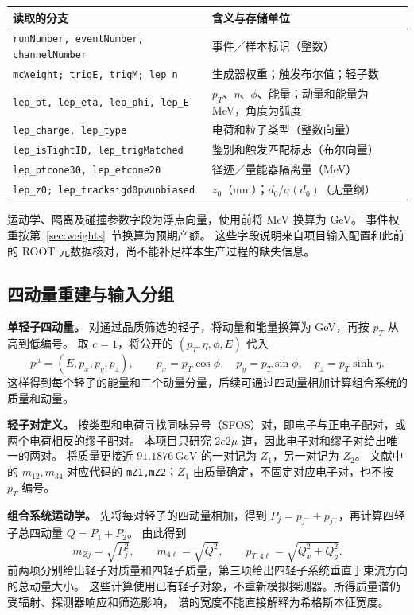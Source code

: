 \documentclass[11pt,a4paper,fontset=fandol,scheme=plain]{ctexart}
\newcommand{\gev}{\,\mathrm{GeV}}
\begin{document}
\begingroup
\small
\renewcommand{\arraystretch}{1.13}
\begin{tabularx}{\linewidth}{@{}p{.62\linewidth}Y@{}}
\toprule
读取的分支 & 含义与存储单位 \\
\midrule
\texttt{runNumber, eventNumber, channelNumber} & 事件／样本标识（整数） \\
\texttt{mcWeight; trigE, trigM; lep\_n} & 生成器权重；触发布尔值；轻子数 \\
\texttt{lep\_pt, lep\_eta, lep\_phi, lep\_E} & $p_T$、$\eta$、$\phi$、能量；动量和能量为 MeV，角度为弧度 \\
\texttt{lep\_charge, lep\_type} & 电荷和粒子类型（整数向量） \\
\texttt{lep\_isTightID, lep\_trigMatched} & 鉴别和触发匹配标志（布尔向量） \\
\texttt{lep\_ptcone30, lep\_etcone20} & 径迹／量能器隔离量（MeV） \\
\texttt{lep\_z0; lep\_tracksigd0pvunbiased} & $z_0$（mm）；$d_0/\sigma(d_0)$（无量纲） \\
\bottomrule
\end{tabularx}
\endgroup

运动学、隔离及碰撞参数字段为浮点向量，使用前将 MeV 换算为 GeV。
事件权重按第~\ref{sec:weights}~节换算为预期产额。
这些字段说明来自项目输入配置和此前的 ROOT 元数据核对，尚不能补足样本生产过程的缺失信息。
\subsection{四动量重建与输入分组}
\textbf{单轻子四动量。} 对通过品质筛选的轻子，将动量和能量换算为 GeV，再按 $p_T$ 从高到低编号。
取 $c=1$，将公开的 $(p_T,\eta,\phi,E)$ 代入
\[
 p^\mu=(E,p_x,p_y,p_z),\qquad
 p_x=p_T\cos\phi,\quad p_y=p_T\sin\phi,\quad p_z=p_T\sinh\eta.
\]
这样得到每个轻子的能量和三个动量分量，后续可通过四动量相加计算组合系统的质量和动量。

\textbf{轻子对定义。} 按类型和电荷寻找同味异号（SFOS）对，即电子与正电子配对，或两个电荷相反的缪子配对。
本项目只研究 $2e2\mu$ 道，因此电子对和缪子对给出唯一的两对。
将质量更接近 $91.1876\gev$ 的一对记为 $Z_1$，另一对记为 $Z_2$。
文献中的 $m_{12},m_{34}$ 对应代码的 \texttt{mZ1,mZ2}；$Z_1$ 由质量确定，不固定对应电子对，也不按 $p_T$ 编号。

\textbf{组合系统运动学。}
先将每对轻子的四动量相加，得到 $P_j=p_{j^-}+p_{j^+}$，再计算四轻子总四动量 $Q=P_1+P_2$。
由此得到
\[
 m_{Zj}=\sqrt{P_j^2},\qquad m_{4\ell}=\sqrt{Q^2},\qquad
 p_{T,4\ell}=\sqrt{Q_x^2+Q_y^2}.
\]
前两项分别给出轻子对质量和四轻子质量，第三项给出四轻子系统垂直于束流方向的总动量大小。
这些计算使用已有轻子对象，不重新模拟探测器。所得质量谱仍受辐射、探测器响应和筛选影响，
谱的宽度不能直接解释为希格斯本征宽度。
\end{document}
